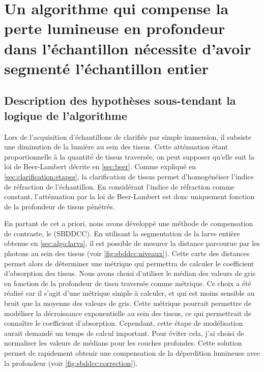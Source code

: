 \documentclass[\main/main.tex]{subfiles}
\begin{document}
\section{Un algorithme qui compense la perte lumineuse en profondeur dans l'échantillon nécessite d'avoir segmenté l'échantillon entier
\label{sec:sbddcc}
}

\subsection{Description des hypothèses sous\hyp{}tendant la logique de l'algorithme}

%
Lors de l'acquisition d'échantillons de \pz{} clarifiés par simple immersion,
il subsiste une diminution de la lumière au sein des tissus.
%
Cette atténuation étant proportionnelle à la quantité de tissus traversée,
on peut supposer qu'elle suit la loi de Beer\hyp{}Lambert décrite en \autoref{sec:beer}.
%
Comme expliqué en \autoref{sec:clarification:etapes}, la clarification de tissus permet d'homogénéiser l'indice de réfraction de l'échantillon. En considérant l'indice de réfraction comme constant, l'atténuation par la loi de Beer\hyp{}Lambert est donc uniquement fonction de la profondeur de tissus pénétrés.

%
En partant de cet a priori, nous avons développé une méthode de compensation de contraste, le \sbddcc{} (SBDDCC).
%
En utilisant la segmentation de la larve entière obtenue en \autoref{sec:algo:larva},
il est possible de mesurer la distance parcourue par les photons au sein des tissus (voir \autoref{fig:sbddcc:niveaux}).
%
Cette carte des distances permet alors de déterminer une métrique qui permettra de calculer le coefficient d'absorption des tissus.
%
Nous avons choisi d'utiliser le médian des valeurs de gris en fonction de la profondeur de tissu traversée comme métrique.
%
Ce choix a été réalisé car il s'agit d'une métrique simple à calculer, et qui est moins sensible au bruit que la moyenne des valeurs de gris. 
%
Cette métrique pourrait permettre de modéliser la décroissance exponentielle au sein des tissus, ce qui permettrait de connaître le coefficient d'absorption.
%
Cependant, cette étape de modélisation aurait demandé un temps de calcul important.
%
Pour éviter cela, j'ai choisi de normaliser les valeurs de médians pour les couches profondes.
%
Cette solution permet de rapidement obtenir une compensation de la déperdition lumineuse avec la profondeur (voir \autoref{fig:sbddcc:correction}).
\end{document}
